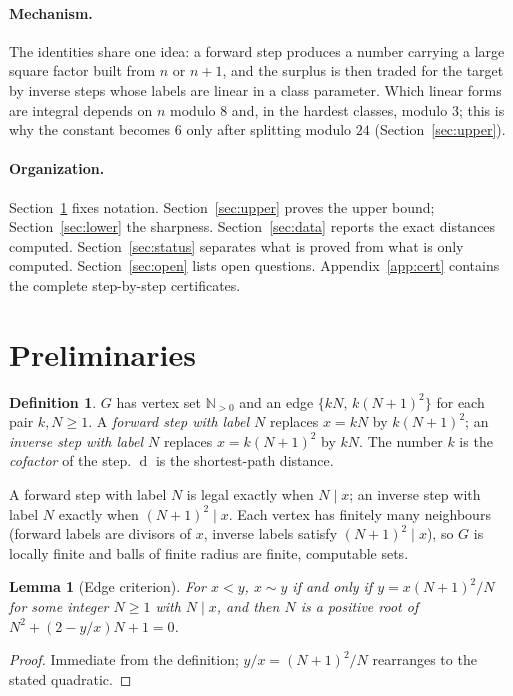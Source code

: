 \documentclass[11pt]{article}
\newtheorem{lemma}[theorem]{Lemma}
\theoremstyle{definition}
\newtheorem{definition}[theorem]{Definition}
\newcommand{\N}{\mathbb{N}}
\newcommand{\dist}{\operatorname{d}}
\begin{document}
\paragraph{Mechanism.}
The identities share one idea: a forward step produces a number carrying a large square factor built from $n$ or
$n+1$, and the surplus is then traded for the target by inverse steps whose labels are linear in a class parameter.
Which linear forms are integral depends on $n$ modulo $8$ and, in the hardest classes, modulo $3$; this is why the
constant becomes $6$ only after splitting modulo $24$ (Section~\ref{sec:upper}).

\paragraph{Organization.}
Section~\ref{sec:prelim} fixes notation. Section~\ref{sec:upper} proves the upper bound; Section~\ref{sec:lower}
the sharpness. Section~\ref{sec:data} reports the exact distances computed. Section~\ref{sec:status} separates what is proved
from what is only computed. Section~\ref{sec:open} lists open questions. Appendix~\ref{app:cert} contains the complete
step-by-step certificates.

\section{Preliminaries}\label{sec:prelim}

\begin{definition}
$G$ has vertex set $\N_{>0}$ and an edge $\{kN,\,k(N+1)^2\}$ for each pair $k,N\ge 1$. A \emph{forward step with
label $N$} replaces $x=kN$ by $k(N+1)^2$; an \emph{inverse step with label $N$} replaces $x=k(N+1)^2$ by $kN$.
The number $k$ is the \emph{cofactor} of the step. $\dist$ is the shortest-path distance.
\end{definition}

A forward step with label $N$ is legal exactly when $N\mid x$; an inverse step with label $N$ exactly when
$(N+1)^2\mid x$. Each vertex has finitely many neighbours (forward labels are divisors of $x$, inverse labels satisfy
$(N+1)^2\mid x$), so $G$ is locally finite and balls of finite radius are finite, computable sets.

\begin{lemma}[Edge criterion]\label{lem:edge}
For $x<y$, $x\sim y$ if and only if $y=x(N+1)^2/N$ for some integer $N\ge1$ with $N\mid x$, and then $N$ is a positive
root of $N^2+(2-y/x)N+1=0$.
\end{lemma}
\begin{proof}
Immediate from the definition; $y/x=(N+1)^2/N$ rearranges to the stated quadratic.
\end{proof}
\end{document}
